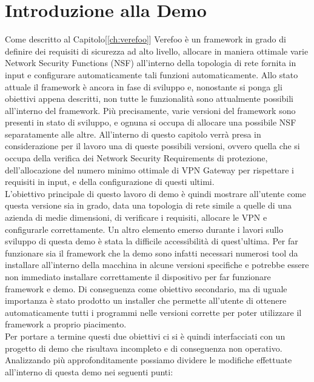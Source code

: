 \section{Introduzione alla Demo}
Come descritto al Capitolo[\ref{ch:verefoo}] Verefoo è un framework in grado di definire dei requisiti di sicurezza ad alto livello, allocare in maniera ottimale varie Network Security Functions (NSF) all'interno della topologia di rete fornita in input e configurare automaticamente tali funzioni 
automaticamente. Allo stato attuale il framework è ancora in fase di sviluppo e, nonostante si ponga gli obiettivi appena descritti, non tutte le funzionalità sono attualmente possibili all'interno del framework. Più precisamente, varie versioni del framework sono presenti in stato di sviluppo, e ognuna si occupa di allocare una possibile NSF separatamente alle altre.
All'interno di questo capitolo verrà presa in considerazione per il lavoro una di queste possibili versioni, ovvero quella che si occupa della verifica dei Network Security Requirements di protezione, dell'allocazione del numero minimo ottimale di VPN Gateway per rispettare i requisiti in input, e della configurazione di questi ultimi.\\
L'obiettivo principale di questo lavoro di demo è quindi mostrare all'utente come questa versione sia in grado, data una topologia di rete simile a quelle di una azienda di medie dimensioni, di verificare i requisiti, allocare le VPN e configurarle correttamente.
\newpage
Un altro elemento emerso durante i lavori sullo sviluppo di questa demo è stata la difficile accessibilità di quest'ultima. Per far funzionare sia il framework che la demo sono infatti necessari numerosi tool da installare all'interno della macchina in alcune versioni specifiche e potrebbe essere non immediato installare correttamente il dispositivo per far funzionare 
framework e demo. Di conseguenza come obiettivo secondario, ma di uguale importanza è stato prodotto un installer che permette all'utente di ottenere automaticamente tutti i programmi nelle versioni corrette per poter utilizzare il framework a proprio piacimento.
\\
Per portare a termine questi due obiettivi ci si è quindi interfacciati con un progetto di demo che risultava incompleto e di conseguenza non operativo. Analizzando più approfonditamente possiamo dividere le modifiche effettuate all'interno di questa demo nei seguenti punti:

